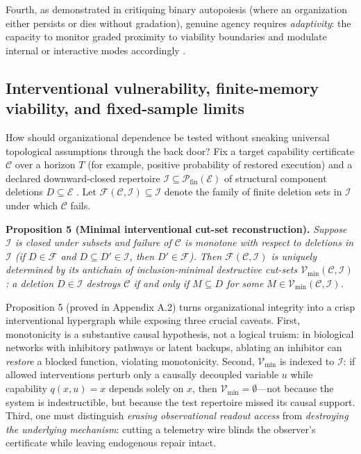 \documentclass[11pt,a4paper]{article}
\begin{document}
Fourth, as \citet{diPaolo2005} demonstrated in critiquing binary
autopoiesis (where an organization either persists or dies without
gradation), genuine agency requires \emph{adaptivity}: the capacity to
monitor graded proximity to viability boundaries
\citep{aubinCellina1984} and modulate internal or interactive modes
accordingly \citep{barandiaran2009, bich2024}.

\subsection{Interventional vulnerability, finite-memory viability, and
fixed-sample
limits}\label{interventional-vulnerability-finite-memory-viability-and-fixed-sample-limits}

How should organizational dependence be tested without sneaking
universal topological assumptions through the back door? Fix a target
capability certificate \(\mathcal{C}\) over a horizon \(T\) (for
example, positive probability of restored execution) and a declared
downward-closed repertoire
\(\mathcal{I} \subseteq \mathcal{P}_{\mathrm{fin}}(\mathcal{E})\) of
structural component deletions \(D \subseteq \mathcal{E}\)
\citep{woodward2003, craver2007}. Let
\(\mathcal{F}(\mathcal{C}, \mathcal{I}) \subseteq \mathcal{I}\) denote
the family of finite deletion sets in \(\mathcal{I}\) under which
\(\mathcal{C}\) fails.

\textbf{Proposition 5 (Minimal interventional cut-set reconstruction).}
\emph{Suppose \(\mathcal{I}\) is closed under subsets and failure of
\(\mathcal{C}\) is monotone with respect to deletions in \(\mathcal{I}\)
(if \(D \in \mathcal{F}\) and \(D \subseteq D' \in \mathcal{I}\), then
\(D' \in \mathcal{F}\)). Then \(\mathcal{F}(\mathcal{C}, \mathcal{I})\)
is uniquely determined by its antichain of inclusion-minimal destructive
cut-sets \(\mathcal{V}_{\min}(\mathcal{C}, \mathcal{I})\): a deletion
\(D \in \mathcal{I}\) destroys \(\mathcal{C}\) if and only if
\(M \subseteq D\) for some
\(M \in \mathcal{V}_{\min}(\mathcal{C}, \mathcal{I})\).}

Proposition 5 (proved in Appendix A.2) turns organizational integrity
into a crisp interventional hypergraph while exposing three crucial
caveats. First, monotonicity is a substantive causal hypothesis, not a
logical truism: in biological networks with inhibitory pathways or
latent backups, ablating an inhibitor can \emph{restore} a blocked
function, violating monotonicity. Second, \(\mathcal{V}_{\min}\) is
indexed to \(\mathcal{I}\): if allowed interventions perturb only a
causally decoupled variable \(u\) while capability \(q(x,u) = x\)
depends solely on \(x\), then \(\mathcal{V}_{\min} = \emptyset\)---not
because the system is indestructible, but because the test repertoire
missed its causal support. Third, one must distinguish \emph{erasing
observational readout access} from \emph{destroying the underlying
mechanism}: cutting a telemetry wire blinds the observer's certificate
while leaving endogenous repair intact.
\end{document}
